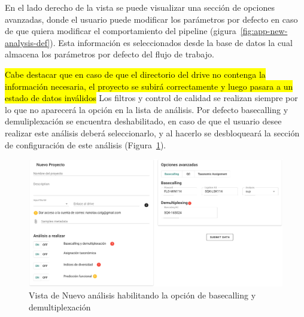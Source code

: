 En el lado derecho de la vista se puede visualizar una sección de opciones avanzadas, donde el usuario puede modificar los parámetros por defecto en caso de que quiera modificar el comportamiento del pipeline (gigura~\ref{fig:app-new-analysis-def}). Esta información es seleccionados desde la base de datos la cual almacena los parámetros por defecto del flujo de trabajo.

\hl{Cabe destacar que en caso de que el directorio del drive no contenga la información necesaria, el proyecto se subirá correctamente y luego pasara a un estado de datos inválidos }
Los filtros y control de calidad se realizan siempre por lo que no aparecerá la opción en la lista de análisis.
Por defecto basecalling y demuliplexación se encuentra deshabilitado, en caso de que el usuario desee realizar este análisis deberá seleccionarlo, y al hacerlo se desbloqueará la sección de configuración de este análisis (Figura~\ref{fig:app-new-analysis-basecallingON}).



\begin{figure}[H]
    \includegraphics[width=1\linewidth]{images/app/newAnalysis/new-analysis-basecallingON.png}

    \caption{Vista de Nuevo análisis habilitando la opción de basecalling y demultiplexación}
    \label{fig:app-new-analysis-basecallingON}
\end{figure}

